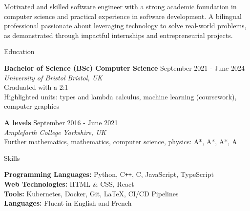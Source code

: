 \documentclass{resume} %
\begin{document}


Motivated and skilled software engineer with a strong academic foundation in computer science and practical experience in software development. A bilingual professional passionate about leveraging technology to solve real-world problems, as demonstrated through impactful internships and entrepreneurial projects.



\begin{rSection}{Education}

{\bf Bachelor of Science (BSc) Computer Science} \hfill {September 2021 - June 2024} \\
\textit{University of Bristol} \hfill \textit{Bristol, UK} \\
Graduated with a 2:1 \\
Highlighted units: types and lambda calculus, machine learning (coursework), computer graphics

{\bf A levels} \hfill {September 2016 - June 2021} \\
\textit{Ampleforth College} \hfill \textit{Yorkshire, UK} \\
Further mathematics, mathematics, computer science, physics: A*, A*, A*, A

\end{rSection}


\begin{rSection}{Skills}

{\bf Programming Languages:} Python, C\texttt{++}, C, JavaScript, TypeScript \\
{\bf Web Technologies:} HTML \& CSS, React \\
{\bf Tools:} Kubernetes, Docker, Git, LaTeX, CI/CD Pipelines \\
{\bf Languages:} Fluent in English and French

\end{rSection}
\end{document}
